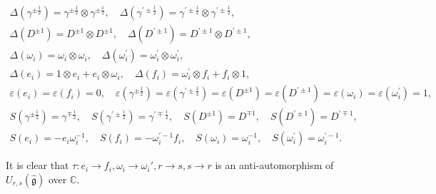 \documentclass[10pt,a4paper]{amsart}
\numberwithin{equation}{section}
\begin{document}
$$
\begin{gathered}
	\Delta\left(\gamma^{ \pm \frac{1}{2}}\right)=\gamma^{ \pm \frac{1}{2}} \otimes \gamma^{ \pm \frac{1}{2}}, \quad \Delta\left(\gamma^{\prime \pm \frac{1}{2}}\right)=\gamma^{\prime \pm \frac{1}{2}} \otimes \gamma^{\prime \pm \frac{1}{2}}, \\
	\Delta\left(D^{ \pm 1}\right)=D^{ \pm 1} \otimes D^{ \pm 1}, \quad \Delta\left(D^{\prime \pm 1}\right)=D^{\prime \pm 1} \otimes D^{\prime \pm 1}, \\
	\Delta\left(\omega_i\right)=\omega_i \otimes \omega_i, \quad \Delta\left(\omega_i^{\prime}\right)=\omega_i^{\prime} \otimes \omega_i^{\prime}, \\
	\Delta\left(e_i\right)= 1\otimes e_i+ e_i\otimes \omega_i, \quad \Delta\left(f_i\right)= \omega_i^{\prime}\otimes f_i +f_i \otimes 1 , \\
	\varepsilon\left(e_i\right)=\varepsilon\left(f_i\right)=0, \quad \varepsilon\left(\gamma^{ \pm \frac{1}{2}}\right)=\varepsilon\left(\gamma^{\prime \pm \frac{1}{2}}\right)=\varepsilon\left(D^{ \pm 1}\right)=\varepsilon\left(D^{\prime \pm 1}\right)=\varepsilon\left(\omega_i\right)=\varepsilon\left(\omega_i^{\prime}\right)=1, \\
	S\left(\gamma^{ \pm \frac{1}{2}}\right)=\gamma^{\mp \frac{1}{2}}, \quad S\left(\gamma^{\prime \pm \frac{1}{2}}\right)=\gamma^{\prime \mp \frac{1}{2}}, \quad S\left(D^{ \pm 1}\right)=D^{\mp 1}, \quad S\left(D^{\prime \pm 1}\right)=D^{\prime \mp 1}, \\
	S\left(e_i\right)=-e_i \omega_i^{-1} , \quad S\left(f_i\right)=-\omega_i^{\prime-1} f_i , \quad S\left(\omega_i\right)=\omega_i^{-1}, \quad S\left(\omega_i^{\prime}\right)=\omega_i^{\prime-1} .
\end{gathered}
$$

It is clear that $\tau: e_i \to f_i , \omega_i\to \omega_i', r\to s, s\to r$ is an anti-automorphism of $U_{r, s}(\widehat{\mathfrak g})$ over $\mathbb C$.
\end{document}
